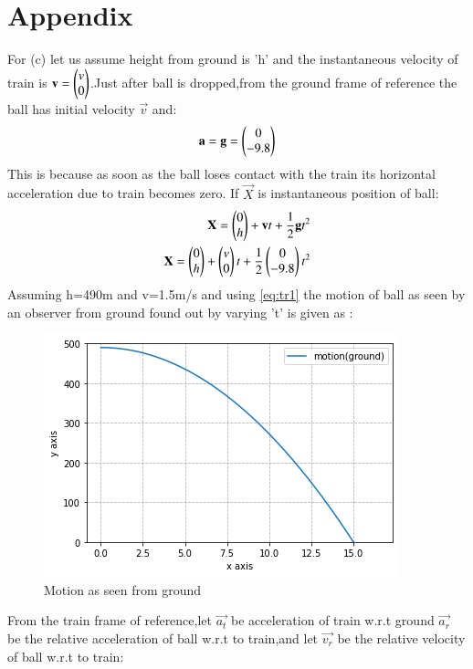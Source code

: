 \documentclass[journal,12pt,twocolumn]{IEEEtran}
\begin{document}
\section{Appendix}
For (c) let us assume height from ground is 'h' and the instantaneous velocity of train is $\mathbf{v}=\begin{pmatrix}v\\0\end{pmatrix}$.Just after ball is dropped,from the ground frame of reference the ball has initial velocity $\vec{v}$ and:
\begin{align}
    \mathbf{a}=\mathbf{g}=\begin{pmatrix}0\\-9.8\end{pmatrix}
\end{align}
This is because as soon as the ball loses contact with the train its horizontal acceleration due to train becomes zero.
If $\vec{X}$ is instantaneous position of ball:
\begin{align}
    \mathbf{X}=\begin{pmatrix}0\\h\end{pmatrix}+\mathbf{v}t+\frac{1}{2}\mathbf{g}t^2\\
    \mathbf{X}=\begin{pmatrix}0\\h\end{pmatrix}+\begin{pmatrix}v\\0\end{pmatrix}t+\frac{1}{2}\begin{pmatrix}0\\-9.8\end{pmatrix}t^2\label{eq:tr1}
\end{align}
Assuming h=490m and v=1.5m/s and using \eqref{eq:tr1} the motion of ball as seen by an observer from ground found out by  varying 't' is given as  :
\begin{figure}[!ht]
\centering
\includegraphics[width=\columnwidth]{figure7_1}
\caption{Motion as seen from ground }
\label{fig:vectors}	
\end{figure}
\linebreak From the train frame of reference,let $\vec{a_t}$ be acceleration of train w.r.t ground  $\vec{a_r}$ be the relative acceleration of ball w.r.t to train,and let $\vec{v_r}$ be the relative velocity of ball w.r.t to train:
\end{document}
